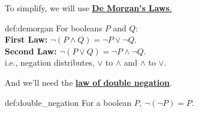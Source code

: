 \noindent
To simplify, we will use \underline{\textbf{De Morgan's Laws}.}\\

\begin{Def}{def:demorgan}
    For booleans $P$ and $Q$:\\
    \textbf{First Law:} $\neg(P \land Q) = \neg P \lor \neg Q$.\\
    \textbf{Second Law:} $\neg(P \lor Q) = \neg P \land \neg Q$.\\

    \noindent
    i.e., negation distributes, $\lor$ to $\land$ and $\land$ to $\lor$.
\end{Def}
And we'll need the \underline{\textbf{law of double negation}}.\\

\begin{Def}{def:double_negation}
    For a boolean $P$, $\neg(\neg P) = P$.
\end{Def}



